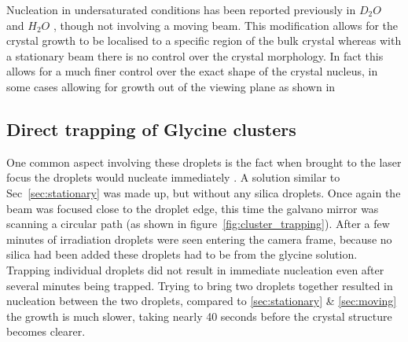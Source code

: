 Nucleation in undersaturated conditions has been reported previously in $D_2O$ 
\cite{Rungsimanon2010} and $H_2O$ \cite{Flannigan2023}, though not involving a 
moving beam. This modification allows for the crystal growth to be localised to
a specific region of the bulk crystal whereas with a stationary beam there is no
control over the crystal morphology. In fact this allows for a much finer control
over the exact shape of the crystal nucleus, in some cases allowing for growth out
of the viewing plane as shown in 

\begin{figure}
	\centering
\end{figure}


\subsection{Direct trapping of Glycine clusters}
\label{sec:clusters}
One common aspect involving these droplets is the fact when brought to the laser 
focus the droplets would nucleate immediately \cite{Liao2022}. A solution similar 
to Sec~\ref{sec:stationary} was made up, but without any silica droplets. Once 
again the beam was focused close to the droplet edge, this time the galvano mirror
was scanning a circular path (as shown in figure~\ref{fig:cluster_trapping}). 
After a few minutes of irradiation droplets were seen entering the camera frame, 
because no silica had been added these droplets had to be from the glycine solution. Trapping individual droplets did not result in immediate nucleation even after 
several minutes being trapped. Trying to bring two droplets together resulted in nucleation between the two droplets, compared to \ref{sec:stationary} \& 
\ref{sec:moving} the growth is much slower, taking nearly 40 seconds before the 
crystal structure becomes clearer.
